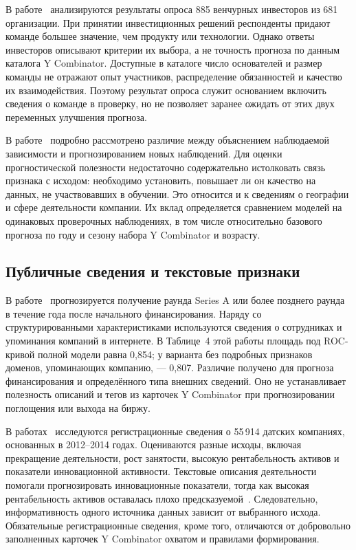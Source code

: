 В работе~\cite{gompers2016} анализируются результаты опроса 885 венчурных инвесторов из 681 организации. При принятии инвестиционных решений респонденты придают команде большее значение, чем продукту или технологии. Однако ответы инвесторов описывают критерии их выбора, а не точность прогноза по данным каталога Y Combinator. Доступные в каталоге число основателей и размер команды не отражают опыт участников, распределение обязанностей и качество их взаимодействия. Поэтому результат опроса служит основанием включить сведения о команде в проверку, но не позволяет заранее ожидать от этих двух переменных улучшения прогноза.

В работе~\cite{shmueli2010} подробно рассмотрено различие между объяснением наблюдаемой зависимости и прогнозированием новых наблюдений. Для оценки прогностической полезности недостаточно содержательно истолковать связь признака с исходом: необходимо установить, повышает ли он качество на данных, не участвовавших в обучении. Это относится и к сведениям о географии и сфере деятельности компании. Их вклад определяется сравнением моделей на одинаковых проверочных наблюдениях, в том числе относительно базового прогноза по году и сезону набора Y Combinator и возрасту.

\subsection{Публичные сведения и текстовые признаки}

В работе~\cite{sharchilev2018} прогнозируется получение раунда Series A или более позднего раунда в течение года после начального финансирования. Наряду со структурированными характеристиками используются сведения о сотрудниках и упоминания компаний в интернете. В Таблице~4 этой работы площадь под ROC-кривой полной модели равна 0,854; у варианта без подробных признаков доменов, упоминающих компанию, --- 0,807. Различие получено для прогноза финансирования и определённого типа внешних сведений. Оно не устанавливает полезность описаний и тегов из карточек Y Combinator при прогнозировании поглощения или выхода на биржу.

В работах~\cite{kaiser2020working,kaiser2020} исследуются регистрационные сведения о 55\,914 датских компаниях, основанных в 2012--2014 годах. Оцениваются разные исходы, включая прекращение деятельности, рост занятости, высокую рентабельность активов и показатели инновационной активности. Текстовые описания деятельности помогали прогнозировать инновационные показатели, тогда как высокая рентабельность активов оставалась плохо предсказуемой~\cite{kaiser2020working}. Следовательно, информативность одного источника данных зависит от выбранного исхода. Обязательные регистрационные сведения, кроме того, отличаются от добровольно заполненных карточек Y Combinator охватом и правилами формирования.


